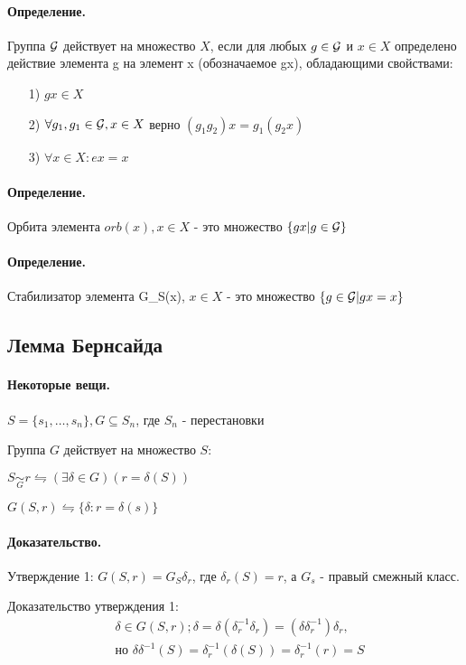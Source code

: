 \documentclass{report}
\begin{document}
\paragraph*{Определение.}
Группа $ {\cal G}$ действует на множество $X$, если для любых  $g \in {\cal G}$ и $x \in X$
определено действие элемента g на элемент x (обозначаемое gx), обладающими свойствами:
\begin{itemize}
	\item[1)] $gx \in X$
	\item[2)] $\forall g_1,g_1 \in {\cal G}, x \in X$ верно $(g_1g_2)x = g_1(g_2x)$
	\item[3)] $\forall x \in X: ex = x$ 
\end{itemize}

\paragraph*{Определение.}
Орбита элемента $orb(x), x \in X$ - это множество $\{gx | g \in {\cal G}\} $ 

\paragraph*{Определение.}
Стабилизатор элемента G_S(x), $x \in X$ - это множество $\{g \in {\cal G} | gx = x\} $ 


\subsection{Лемма Бернсайда}
\paragraph*{Некоторые вещи.}
$S = \{s_1,\ldots,s_{n}\}, G \subseteq S_{n}$, где $S_{n}$ - перестановки

Группа $G$ действует на множество  $S$:

$S \underset{G}{\sim} r \leftrightharpoons (\exists  \delta \in G)(r =\delta(S))$

\medskip

$G(S,r) \leftrightharpoons \{\delta: r = \delta(s)\} $

\paragraph*{Доказательство.}
Утверждение 1: $G(S,r) = G_{S}\delta_{r}$, где $\delta_{r}(S) = r$, а $G_{s}$ -
правый смежный класс.

Доказательство утверждения 1:
\[
\begin{align*}
&\delta \in G(S,r); \delta = \delta(\delta_{r}^{-1}\delta_{r}) = 
(\delta\delta_{r}^{-1})\delta_{r}, \\
&\mbox{но } \delta\delta^{-1}(S) = \delta^{-1}_{r}(\delta(S)) = 
\delta_{r}^{-1}(r) = S \\
\end{align*}
\] 
\end{document}
